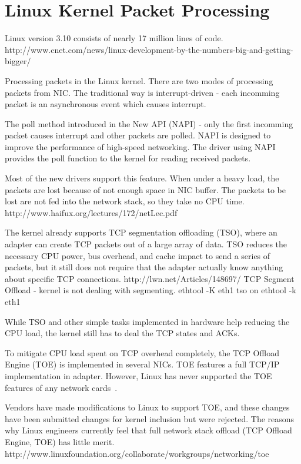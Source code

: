 
\chapter{Linux Kernel Packet Processing}

Linux version 3.10 consists of nearly 17 million lines of code.
http://www.cnet.com/news/linux-development-by-the-numbers-big-and-getting-bigger/

Processing packets in the Linux kernel.
There are two modes of processing packets from NIC.
The traditional way is interrupt-driven - each incomming packet is an
asynchronous event which causes interrupt.

The poll method introduced in the New API (NAPI) - only the first incomming packet causes interrupt
and other packets are polled.
NAPI is designed to improve the performance of high-speed networking.
The driver using NAPI provides the poll function to the kernel for reading received packets.

Most of the new drivers support this feature.
When under a heavy load, the packets are lost because of not enough space in NIC buffer.
The packets to be lost are not fed into the network stack, so they take no CPU time.
http://www.haifux.org/lectures/172/netLec.pdf


The kernel already supports TCP segmentation offloading (TSO), where an adapter can create TCP packets out of a large array of data.
TSO reduces the necessary CPU power, bus overhead, and cache impact to send a series of packets,
but it still does not require that the adapter actually know anything about specific TCP connections.
http://lwn.net/Articles/148697/
TCP Segment Offload - kernel is not dealing with segmenting.
ethtool -K eth1 tso on
ethtool -k eth1


While TSO and other simple tasks implemented in hardware help reducing the CPU load,
the kernel still has to deal the TCP states and ACKs.

To mitigate CPU load spent on TCP overhead completely, the TCP Offload Engine (TOE) is implemented in several NICs.
TOE features a full TCP/IP implementation in adapter.
However, Linux has never supported the TOE features of any network cards~\cite{http://lwn.net/Articles/148697/}.

Vendors have made modifications to Linux to support TOE, and these changes have been submitted changes for kernel inclusion but were rejected.
The reasons why Linux engineers currently feel that full network stack offload (TCP Offload Engine, TOE) has little merit.
http://www.linuxfoundation.org/collaborate/workgroups/networking/toe

